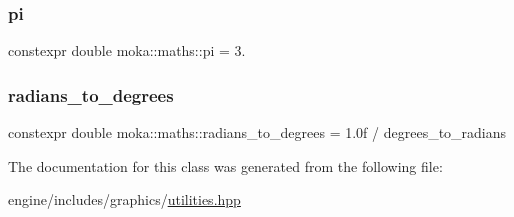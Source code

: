 \mbox{\label{classmoka_1_1maths_a6ef4ef43afc0c5179f724bacbda196b4}} 
\subsubsection{\texorpdfstring{pi}{pi}}
{\footnotesize\ttfamily constexpr double moka\+::maths\+::pi = 3.\hspace{0.3cm}{\ttfamily [static]}}

\mbox{\label{classmoka_1_1maths_a601fb0ce26476398a25bf91e7d26ef1a}} 
\subsubsection{\texorpdfstring{radians\_to\_degrees}{radians\_to\_degrees}}
{\footnotesize\ttfamily constexpr double moka\+::maths\+::radians\+\_\+to\+\_\+degrees = 1.\+0f / degrees\+\_\+to\+\_\+radians\hspace{0.3cm}{\ttfamily [static]}}



The documentation for this class was generated from the following file\+:\begin{DoxyCompactItemize}
\item 
engine/includes/graphics/\mbox{\hyperlink{utilities_8hpp}{utilities.\+hpp}}\end{DoxyCompactItemize}
